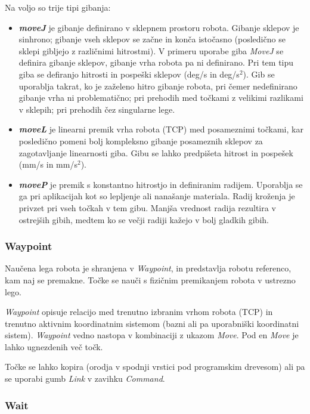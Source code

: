 Na voljo so trije tipi gibanja:
\begin{itemize}
  \item \emph{\textbf{moveJ}} je gibanje definirano v sklepnem prostoru robota. Gibanje sklepov je sinhrono; gibanje vseh sklepov se začne in konča istočasno (posledično se sklepi gibljejo z različnimi hitrostmi). V primeru uporabe giba \emph{MoveJ} se definira gibanje sklepov, gibanje vrha robota pa ni definirano. Pri tem tipu giba se defiranjo hitrosti in pospeški sklepov (deg/s in deg/s${}^2$). Gib se uporablja takrat, ko je zaželeno hitro gibanje robota, pri čemer nedefinirano gibanje vrha ni problematično; pri prehodih med točkami z velikimi razlikami v sklepih; pri prehodih čez singularne lege.
  \item \emph{\textbf{moveL}} je linearni premik vrha robota (TCP) med posameznimi točkami, kar posledično pomeni bolj kompleksno gibanje posameznih sklepov za zagotavljanje linearnosti giba. Gibu se lahko predpišeta hitrost in pospešek (mm/s in mm/s${}^2$).
  \item \emph{\textbf{moveP}} je premik s konstantno hitrostjo in definiranim radijem. Uporablja se ga pri aplikacijah kot so lepljenje ali nanašanje materiala. Radij kroženja je privzet pri vseh točkah v tem gibu. Manjša vrednost radija rezultira v ostrejših gibih, medtem ko se večji radiji kažejo v bolj gladkih gibih.
\end{itemize}

\subsubsection{Waypoint}

Naučena lega robota je shranjena v \emph{Waypoint}, in predstavlja robotu referenco, kam naj se premakne. Točke se nauči s fizičnim premikanjem robota v ustrezno lego.

\emph{Waypoint} opisuje relacijo med trenutno izbranim vrhom robota (TCP) in trenutno aktivnim koordinatnim sistemom (bazni ali pa uporabniški koordinatni sistem). \emph{Waypoint} vedno nastopa v kombinaciji z ukazom \emph{Move}. Pod en \emph{Move} je lahko ugnezdenih več točk.

Točke se lahko kopira (orodja v spodnji vrstici pod programskim drevesom) ali pa se uporabi gumb \emph{Link} v zavihku \emph{Command}.


\subsubsection{Wait}

